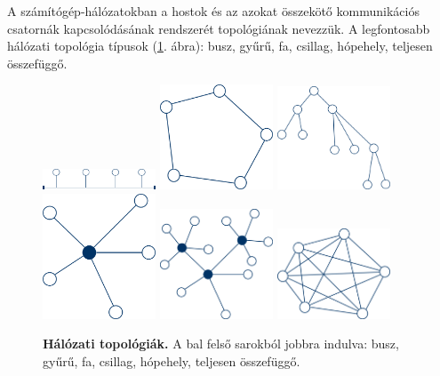 \documentclass[12pt]{article}
\theoremstyle{plain}
\begin{document}
A számítógép-hálózatokban a hostok és az azokat összekötő kommunikációs csatornák kapcsolódásának rendszerét topológiának nevezzük.  A legfontosabb hálózati topológia típusok (\ref{fig:top}. ábra): busz, gyűrű, fa, csillag, hópehely, teljesen összefüggő.

\begin{figure}[H]
\centering
    \includegraphics[width=0.3\textwidth]{media/bus.png}
    \hspace{0.75cm}
    \includegraphics[width=0.3\textwidth]{media/gyuru.png}
    \vspace{1.5cm}
    \includegraphics[width=0.3\textwidth]{media/fa.png}
    \hspace{1cm}
    \includegraphics[width=0.3\textwidth]{media/csillag.png}
    \vspace{1.5cm}
    \includegraphics[width=0.3\textwidth]{media/hop.png}
     \hspace{1cm}
    \includegraphics[width=0.3\textwidth]{media/telj.png}    
    \caption{\textbf{Hálózati topológiák.} A bal felső sarokból jobbra indulva: busz, gyűrű, fa, csillag, hópehely, teljesen összefüggő.} 
    \label{fig:top}


\end{figure}
\end{document}
